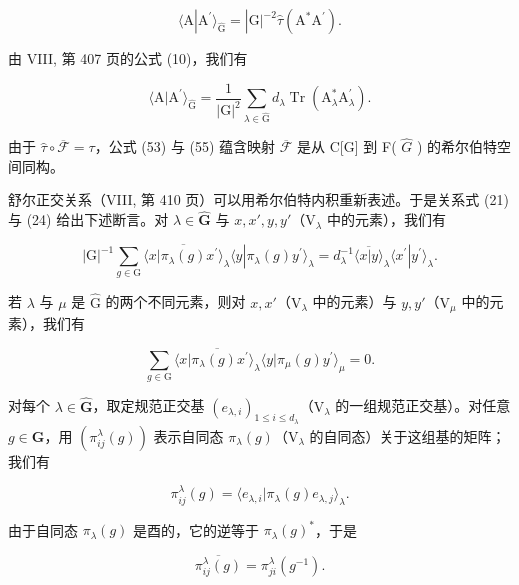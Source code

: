\[
\langle \mathrm{A} | \mathrm{A} ^ {\prime} \rangle_ {\widehat {\mathrm{G}}} = | \mathrm{G} | ^ {- 2} \widehat {\tau} (\mathrm{A} ^ {*} \mathrm{A} ^ {\prime}).\tag{55}
\]

由 VIII, 第 407 页的公式 (10)，我们有

\[
\langle \mathrm{A} | \mathrm{A} ^ {\prime} \rangle_ {\widehat {\mathrm{G}}} = \frac {1}{| \mathrm{G} | ^ {2}} \sum_ {\lambda \in \widehat {\mathrm{G}}} d _ {\lambda} \operatorname{Tr} (\mathrm{A} _ {\lambda} ^ {*} \mathrm{A} _ {\lambda} ^ {\prime}).\tag{56}
\]

由于 \(\hat{\tau}\circ\overline{{\mathcal{F}}}=\tau\)，公式 (53) 与 (55) 蕴含映射 \(\overline{{\mathcal{F}}}\) 是从 C{[}G{]} 到 F( \(\widehat{G}\) ) 的希尔伯特空间同构。

舒尔正交关系（VIII, 第 410 页）可以用希尔伯特内积重新表述。于是关系式 (21) 与 (24) 给出下述断言。对 \(\lambda \in \widehat{\mathbf{G}}\) 与 \(x, x', y, y'\)（\(\mathrm{V}_{\lambda}\) 中的元素），我们有

\[
| \mathrm{G} | ^ {- 1} \sum_ {g \in \mathrm{G}} \overline {{\langle x | \pi_ {\lambda} (g) x ^ {\prime} \rangle}} _ {\lambda} \langle y | \pi_ {\lambda} (g) y ^ {\prime} \rangle_ {\lambda} = d _ {\lambda} ^ {- 1} \overline {{\langle x | y \rangle}} _ {\lambda} \langle x ^ {\prime} | y ^ {\prime} \rangle_ {\lambda}.\tag{57}
\]

若 \(\lambda\) 与 \(\mu\) 是 \(\widehat{\mathrm{G}}\) 的两个不同元素，则对 \(x, x'\)（\(\mathrm{V}_{\lambda}\) 中的元素）与 \(y, y'\)（\(\mathrm{V}_{\mu}\) 中的元素），我们有

\[
\sum_ {g \in \mathrm{G}} \overline {{\langle x | \pi_ {\lambda} (g) x ^ {\prime} \rangle_ {\lambda}}} \langle y | \pi_ {\mu} (g) y ^ {\prime} \rangle_ {\mu} = 0.\tag{58}
\]

对每个 \(\lambda \in \widehat{\mathbf{G}}\)，取定规范正交基 \((e_{\lambda,i})_{1\leqslant i\leqslant d_{\lambda}}\)（\(\mathrm{V}_{\lambda}\) 的一组规范正交基）。对任意 \(g\in \mathbf{G}\)，用 \((\pi_{ij}^{\lambda}(g))\) 表示自同态 \(\pi_{\lambda}(g)\)（\(\mathrm{V}_{\lambda}\) 的自同态）关于这组基的矩阵；我们有

\[
\pi_ {i j} ^ {\lambda} (g) = \langle e _ {\lambda , i} | \pi_ {\lambda} (g) e _ {\lambda , j} \rangle_ {\lambda}.\tag{59}
\]

由于自同态 \(\pi_{\lambda}(g)\) 是酉的，它的逆等于 \(\pi_{\lambda}(g)^*\)，于是

\[
\overline {{\pi_ {i j} ^ {\lambda} (g)}} = \pi_ {j i} ^ {\lambda} (g ^ {- 1}).\tag{60}
\]

